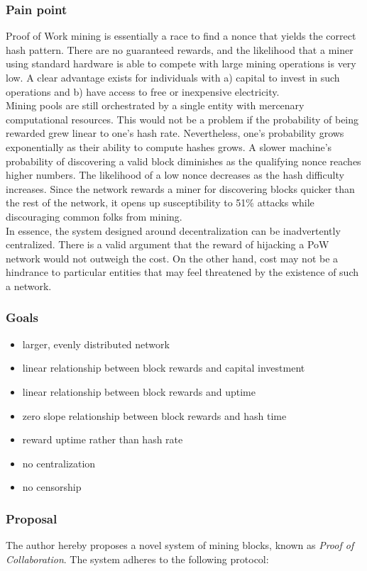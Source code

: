 \documentclass[10pt,twocolumn]{article}
\begin{document}
\subsubsection{Pain point}
Proof of Work mining is essentially a race to find a nonce that yields the correct hash pattern. 
There are no guaranteed rewards, and the likelihood that a miner using standard hardware is able to compete with large mining operations is very low. A clear advantage exists for individuals with a) capital to invest in such operations and b) have access to free or inexpensive electricity. \\
Mining pools are still orchestrated by a single entity with mercenary computational resources.
This would not be a problem if the probability of being rewarded grew linear to one's hash rate. Nevertheless, one’s probability grows exponentially as their ability to compute hashes grows. A slower machine's probability of discovering a valid block diminishes as the qualifying nonce reaches higher numbers. The likelihood of a low nonce decreases as the hash difficulty increases. Since the network rewards a miner for discovering blocks quicker than the rest of the network, it opens up susceptibility to 51\% attacks while discouraging common folks from mining.\\
In essence, the system designed around decentralization can be inadvertently centralized. There is a valid argument that the reward of hijacking a PoW network would not outweigh the cost. On the other hand, cost may not be a hindrance to particular entities that may feel threatened by the existence of such a network.
\subsubsection{Goals}
\begin{itemize}
\item larger, evenly distributed network
\item linear relationship between block rewards and capital investment
\item linear relationship between block rewards and uptime
\item zero slope relationship between block rewards and hash time
\item reward uptime rather than hash rate
\item no centralization
\item no censorship
\end{itemize}
\subsubsection{Proposal}
The author hereby proposes a novel system of mining blocks, known as \textit{Proof of Collaboration}.  The system adheres to the following protocol:
\end{document}
